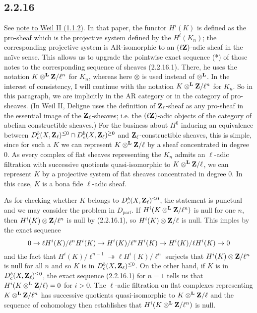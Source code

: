 \documentclass[deligne.tex]{subfiles}
\begin{document}
	\subsection*{2.2.16} See
	\hyperref[WeilII_1.1.2]{note to Weil II (1.1.2)}.
	In that paper, the functor $H^i(K)$ is defined as the pro-sheaf which is
	the projective system defined by the $H^i(K_n)$; the corresponding
	projective system is AR-isomorphic to an $(\ell\mathbf{Z})$-adic sheaf in the 
	naïve sense. This allows us to upgrade the pointwise exact sequence (*)
	of those notes to the corresponding sequence of sheaves (2.2.16.1).
	There, he uses the notation $K\otimes^{\mathbf{L}}\mathbf{Z}/\ell^n$ for $K_n$, whereas
	here $\otimes$ is used instead of $\otimes^{\mathbf{L}}$. In the interest of
	consistency, I will continue with the notation
	$K\otimes^{\mathbf{L}}\mathbf{Z}/\ell^n$ for $K_n$.
	So in this paragraph, we are implicitly in the AR category or in the
	category of pro-sheaves.
	(In Weil II, Deligne uses the definition
	of $\mathbf{Z}_\ell$-sheaf as any pro-sheaf in the essential image of the
	$\mathbf{Z}_\ell$-sheaves; i.e. the $(\ell\mathbf{Z})$-adic objects of the category
	of abelian constructible sheaves.)
	For the business about $H^0$ inducing an equivalence
	between $D_c^b(X,\mathbf{Z}_\ell)^{\leq0}\cap D_c^b(X,\mathbf{Z}_\ell)^{\geq0}$ and
	$\mathbf{Z}_\ell$-constructible sheaves, this is simple, since for such a $K$
	we can represent
	$K\otimes^{\mathbf{L}}\mathbf{Z}/\ell$ by a sheaf concentrated in degree 0.
	As every complex of flat sheaves representing the $K_n$ admits an
	$\ell$-adic filtration with successive quotients quasi-isomorphic to
	$K\otimes^{\mathbf{L}}\mathbf{Z}/\ell$, we can represent $K$ by a projective system of
	flat sheaves concentrated in degree 0. In this case, $K$ is a bona fide
	$\ell$-adic sheaf.
	
	As for checking whether $K$ belongs to $D_c^b(X,\mathbf{Z}_\ell)^{\leq0}$,
	the statement is punctual and we may consider the problem in
	$D_{\mathrm{parf}}$. If $H^i(K\otimes^{\mathbf{L}}\mathbf{Z}/\ell^n)$ is null for one $n$,
	then $H^i(K)\otimes\mathbf{Z}/\ell^n$ is null by (2.2.16.1), so
	$H^i(K)\otimes\mathbf{Z}/\ell$ is null. This imples by the exact sequence
	\begin{equation*}
		0\rightarrow\ell H^i(K)/\ell^n H^i(K)\rightarrow H^i(K)/\ell^n H^i(K)\rightarrow H^i(K)/\ell H^i(K)\rightarrow0
	\end{equation*}
	and the fact that
	$H^i(K)/\ell^{n-1}\twoheadrightarrow\ell H^i(K)/\ell^n$ surjects
	that $H^i(K)\otimes\mathbf{Z}/\ell^n$ is null for all $n$ and so $K$ is in
	$D_c^b(X,\mathbf{Z}_\ell)^{\leq0}$. On the other hand, if $K$ is in
	$D_c^b(X,\mathbf{Z}_\ell)^{\leq0}$, the exact sequence (2.2.16.1) for $n=1$
	tells us that $H^i(K\otimes^{\mathbf{L}}\mathbf{Z}/\ell)=0$ for $i>0$.
	The $\ell$-adic filtration on flat complexes 
	representing $K\otimes^{\mathbf{L}}\mathbf{Z}/\ell^n$ has successive quotients
	quasi-isomorphic to $K\otimes^{\mathbf{L}}\mathbf{Z}/\ell$ and the sequence of cohomology
	then establishes that $H^i(K\otimes^{\mathbf{L}}\mathbf{Z}/\ell^n)$ is null.
	
\end{document}
